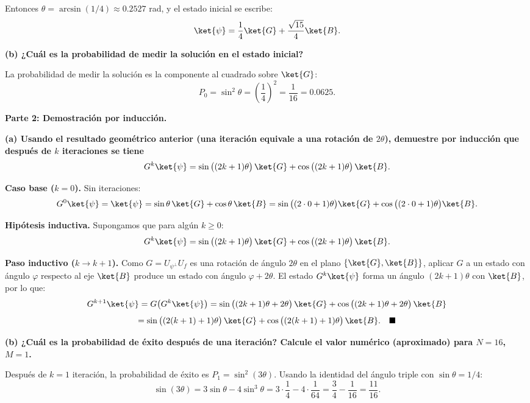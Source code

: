 Entonces $\theta = \arcsin(1/4) \approx 0.2527$ rad, y el estado inicial se escribe:
$$
    \ket{\psi} = \frac{1}{4}\ket{G} + \frac{\sqrt{15}}{4}\ket{B}.
$$

\vspace{0.5cm}

{\bfseries (b) ¿Cuál es la probabilidad de medir la solución en el estado inicial?}

La probabilidad de medir la solución es la componente al cuadrado sobre $\ket{G}$:
$$
    P_0 = \sin^2\theta = \left(\frac{1}{4}\right)^2 = \boxed{\frac{1}{16} = 0.0625.}
$$

\vspace{0.5cm}

{\bfseries Parte 2: Demostración por inducción.}

{\bfseries (a) Usando el resultado geométrico anterior (una iteración equivale a una rotación de $2\theta$), demuestre por inducción que después de $k$ iteraciones se tiene
    $$
        G^k\ket{\psi} = \sin\big((2k+1)\theta\big)\,\ket{G} + \cos\big((2k+1)\theta\big)\,\ket{B}.
    $$
}

\textbf{Caso base ($k=0$).} Sin iteraciones:
$$
    G^0\ket{\psi} = \ket{\psi} = \sin\theta\,\ket{G} + \cos\theta\,\ket{B} = \sin\big((2\cdot 0 + 1)\theta\big)\ket{G} + \cos\big((2\cdot 0 + 1)\theta\big)\ket{B}.
$$

\textbf{Hipótesis inductiva.} Supongamos que para algún $k \geq 0$:
$$
    G^k\ket{\psi} = \sin\big((2k+1)\theta\big)\,\ket{G} + \cos\big((2k+1)\theta\big)\,\ket{B}.
$$

\textbf{Paso inductivo ($k \to k+1$).} Como $G = U_{\psi^\perp} U_f$ es una rotación de ángulo $2\theta$ en el plano $\{\ket{G}, \ket{B}\}$, aplicar $G$ a un estado con ángulo $\varphi$ respecto al eje $\ket{B}$ produce un estado con ángulo $\varphi + 2\theta$. El estado $G^k\ket{\psi}$ forma un ángulo $(2k+1)\theta$ con $\ket{B}$, por lo que:
$$
    G^{k+1}\ket{\psi} = G\big(G^k\ket{\psi}\big) = \sin\big((2k+1)\theta + 2\theta\big)\,\ket{G} + \cos\big((2k+1)\theta + 2\theta\big)\,\ket{B}
$$
$$
    = \sin\big((2(k+1)+1)\theta\big)\,\ket{G} + \cos\big((2(k+1)+1)\theta\big)\,\ket{B}. \quad \blacksquare
$$

\vspace{0.5cm}

{\bfseries (b) ¿Cuál es la probabilidad de éxito después de una iteración? Calcule el valor numérico (aproximado) para $N=16$, $M=1$.}

Después de $k=1$ iteración, la probabilidad de éxito es $P_1 = \sin^2(3\theta)$. Usando la identidad del ángulo triple con $\sin\theta = 1/4$:
$$
    \sin(3\theta) = 3\sin\theta - 4\sin^3\theta = 3 \cdot \frac{1}{4} - 4 \cdot \frac{1}{64} = \frac{3}{4} - \frac{1}{16} = \frac{11}{16}.
$$


